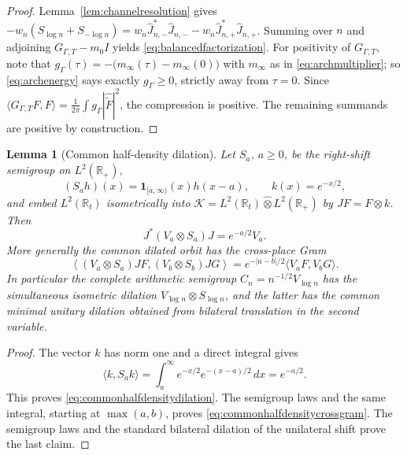 \documentclass[11pt]{amsart}
\newtheorem{lemma}[theorem]{Lemma}
\theoremstyle{definition}
\theoremstyle{remark}
\begin{document}
\begin{proof}
Lemma~\ref{lem:channelresolution} gives
\(-w_n(S_{\log n}+S_{-\log n})
 =w_n\widehat J_{n,-}^*\widehat J_{n,-}-w_n\widehat J_{n,+}^*\widehat J_{n,+}\).
Summing over \(n\) and adjoining \(G_{\Gamma,T}-m_0I\) yields
\eqref{eq:balancedfactorization}.  For positivity of \(G_{\Gamma,T}\), note
that \(g_\Gamma(\tau)=-\bigl(m_\infty(\tau)-m_\infty(0)\bigr)\) with
\(m_\infty\) as in \eqref{eq:archmultiplier}; so \eqref{eq:archenergy} says
exactly \(g_\Gamma\ge0\), strictly away from \(\tau=0\).  Since
\(\langle G_{\Gamma,T}F,F\rangle
 =\frac1{2\pi}\int g_\Gamma|\widehat{\widetilde F}|^2\), the compression is
positive.  The remaining summands are positive by construction.
\end{proof}

\begin{lemma}[Common half-density dilation]\label{lem:commonhalfdensitydilation}
Let $S_a$, $a\ge0$, be the right-shift semigroup on
\(L^2(\mathbb R_+)\),
\[
 (S_ah)(x)=\mathbf 1_{[a,\infty)}(x)h(x-a),
 \qquad k(x)=e^{-x/2},
\]
and embed $L^2(\mathbb R_t)$ isometrically into
\(\mathcal K=L^2(\mathbb R_t)\widehat\otimes L^2(\mathbb R_+)\) by
\(JF=F\otimes k\).  Then
\begin{equation}\label{eq:commonhalfdensitydilation}
 J^*(V_a\otimes S_a)J=e^{-a/2}V_a.
\end{equation}
More generally the common dilated orbit has the cross-place Gram
\begin{equation}\label{eq:commonhalfdensitycrossgram}
 \left\langle(V_a\otimes S_a)JF,(V_b\otimes S_b)JG\right\rangle
 =e^{-|a-b|/2}\langle V_aF,V_bG\rangle.
\end{equation}
In particular the complete arithmetic semigroup
\(C_n=n^{-1/2}V_{\log n}\) has the simultaneous isometric dilation
\(V_{\log n}\otimes S_{\log n}\), and the latter has the common minimal
unitary dilation obtained from bilateral translation in the second variable.
\end{lemma}

\begin{proof}
The vector $k$ has norm one and a direct integral gives
\[
 \langle k,S_ak\rangle
 =\int_a^\infty e^{-x/2}e^{-(x-a)/2}\,dx=e^{-a/2}.
\]
This proves \eqref{eq:commonhalfdensitydilation}.  The semigroup laws and the
same integral, starting at \(\max(a,b)\), proves
\eqref{eq:commonhalfdensitycrossgram}.  The semigroup laws and the standard
bilateral dilation of the unilateral shift prove the last claim.
\end{proof}
\end{document}
